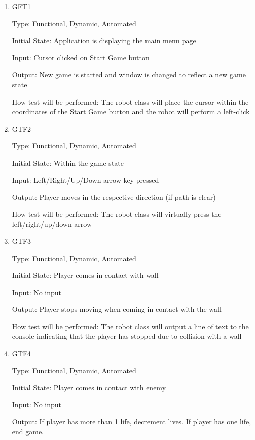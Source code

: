 \documentclass[12pt, titlepage]{article}
\begin{document}
\begin{enumerate}

\item{GFT1\\}

Type: Functional, Dynamic, Automated
					
Initial State: Application is displaying the main menu page
					
Input: Cursor clicked on Start Game button
					
Output: New game is started and window is changed to reflect a new game state
					
How test will be performed: The robot class will place the cursor within the coordinates of the Start Game button and the robot will perform a left-click
					
\item{GTF2\\}

Type: Functional, Dynamic, Automated
					
Initial State: Within the game state
					
Input: Left/Right/Up/Down arrow key pressed
					
Output: Player moves in the respective direction (if path is clear)
					
How test will be performed: The robot class will virtually press the left/right/up/down arrow

\item{GTF3\\}

Type: Functional, Dynamic, Automated
					
Initial State: Player comes in contact with wall
					
Input: No input
					
Output: Player stops moving when coming in contact with the wall

How test will be performed: The robot class will output a line of text to the console indicating that the player has stopped due to collision with a wall

\item{GTF4\\}

Type: Functional, Dynamic, Automated
					
Initial State: Player comes in contact with enemy
					
Input: No input
					
Output: If player has more than 1 life, decrement lives. If player has one life, end game.


\end{enumerate}
\end{document}
